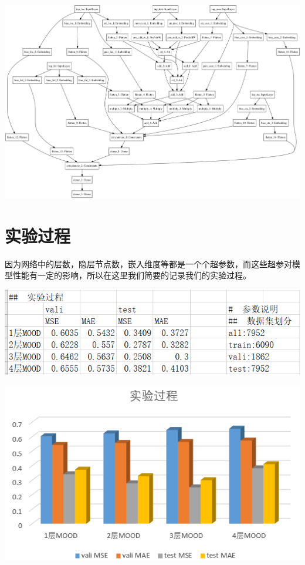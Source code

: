 \documentclass[a4paper, 12pt]{ctexart}
\begin{document}
\includegraphics[width=6inc]{tweet_pics/model_noshape}

\section{实验过程}
因为网络中的层数，隐层节点数，嵌入维度等都是一个个超参数，而这些超参对模型性能有一定的影响，所以在这里我们简要的记录我们的实验过程。

\includegraphics[width=6inc]{tweet_pics/tb}

\includegraphics[width=6inc]{tweet_pics/graph}
\renewcommand{\refname}{Reference}
\begin{thebibliography}{9}
    \end{thebibliography}
\end{document}
